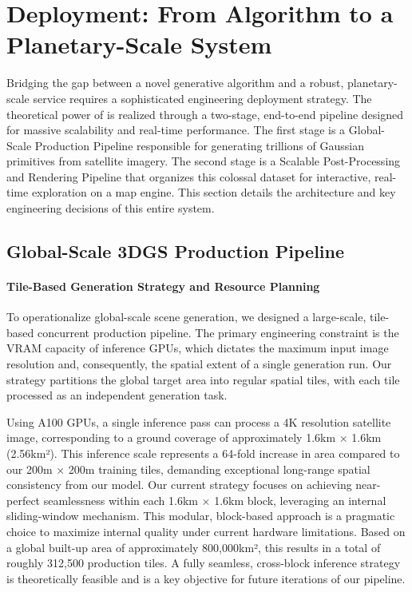 \section{Deployment: From Algorithm to a Planetary-Scale System}
\label{sec:deployment}

Bridging the gap between a novel generative algorithm and a robust, planetary-scale service requires a sophisticated engineering deployment strategy. The theoretical power of \method{} is realized through a two-stage, end-to-end pipeline designed for massive scalability and real-time performance. The first stage is a {Global-Scale Production Pipeline} responsible for generating trillions of Gaussian primitives from satellite imagery. The second stage is a {Scalable Post-Processing and Rendering Pipeline} that organizes this colossal dataset for interactive, real-time exploration on a map engine. This section details the architecture and key engineering decisions of this entire system.

\subsection{Global-Scale 3DGS Production Pipeline}

\paragraph{Tile-Based Generation Strategy and Resource Planning}
To operationalize global-scale scene generation, we designed a large-scale, tile-based concurrent production pipeline. The primary engineering constraint is the VRAM capacity of inference GPUs, which dictates the maximum input image resolution and, consequently, the spatial extent of a single generation run. Our strategy partitions the global target area into regular spatial tiles, with each tile processed as an independent generation task.

Using A100 GPUs, a single inference pass can process a 4K resolution satellite image, corresponding to a ground coverage of approximately 1.6km × 1.6km (2.56km²). This inference scale represents a {64-fold increase in area} compared to our 200m × 200m training tiles, demanding exceptional long-range spatial consistency from our model. Our current strategy focuses on achieving near-perfect seamlessness within each 1.6km × 1.6km block, leveraging an internal sliding-window mechanism. This modular, block-based approach is a pragmatic choice to maximize internal quality under current hardware limitations. Based on a global built-up area of approximately 800,000km², this results in a total of roughly 312,500 production tiles. A fully seamless, cross-block inference strategy is theoretically feasible and is a key objective for future iterations of our pipeline.

